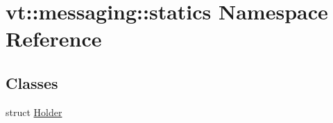 \hypertarget{namespacevt_1_1messaging_1_1statics}{}\section{vt\+:\+:messaging\+:\+:statics Namespace Reference}
\label{namespacevt_1_1messaging_1_1statics}
\subsection*{Classes}
\begin{DoxyCompactItemize}
\item 
struct \hyperlink{structvt_1_1messaging_1_1statics_1_1_holder}{Holder}
\end{DoxyCompactItemize}
